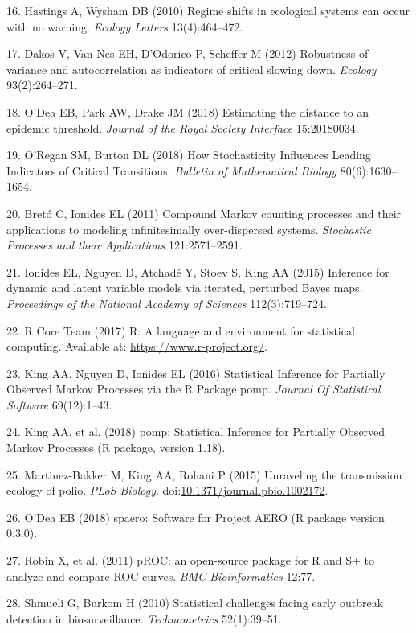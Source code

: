\documentclass[3p]{elsarticle} %
\begin{document}
\hypertarget{ref-Hastings2010}{}
16. Hastings A, Wysham DB (2010) Regime shifts in ecological systems can
occur with no warning. \emph{Ecology Letters} 13(4):464--472.

\hypertarget{ref-Dakos2012a}{}
17. Dakos V, Van Nes EH, D'Odorico P, Scheffer M (2012) Robustness of
variance and autocorrelation as indicators of critical slowing down.
\emph{Ecology} 93(2):264--271.

\hypertarget{ref-ODea2018a}{}
18. O'Dea EB, Park AW, Drake JM (2018) Estimating the distance to an
epidemic threshold. \emph{Journal of the Royal Society Interface}
15:20180034.

\hypertarget{ref-ORegan2018}{}
19. O'Regan SM, Burton DL (2018) How Stochasticity Influences Leading
Indicators of Critical Transitions. \emph{Bulletin of Mathematical
Biology} 80(6):1630--1654.

\hypertarget{ref-Breto2011}{}
20. Bretó C, Ionides EL (2011) Compound Markov counting processes and
their applications to modeling infinitesimally over-dispersed systems.
\emph{Stochastic Processes and their Applications} 121:2571--2591.

\hypertarget{ref-Ionides2015}{}
21. Ionides EL, Nguyen D, Atchadé Y, Stoev S, King AA (2015) Inference
for dynamic and latent variable models via iterated, perturbed Bayes
maps. \emph{Proceedings of the National Academy of Sciences}
112(3):719--724.

\hypertarget{ref-R2017}{}
22. R Core Team (2017) R: A language and environment for statistical
computing. Available at: \url{https://www.r-project.org/}.

\hypertarget{ref-King2016}{}
23. King AA, Nguyen D, Ionides EL (2016) Statistical Inference for
Partially Observed Markov Processes via the R Package pomp.
\emph{Journal Of Statistical Software} 69(12):1--43.

\hypertarget{ref-King2018}{}
24. King AA, et al. (2018) pomp: Statistical Inference for Partially
Observed Markov Processes (R package, version 1.18).

\hypertarget{ref-Martinez-Bakker2015}{}
25. Martinez-Bakker M, King AA, Rohani P (2015) Unraveling the
transmission ecology of polio. \emph{PLoS Biology}.
doi:\href{https://doi.org/10.1371/journal.pbio.1002172}{10.1371/journal.pbio.1002172}.

\hypertarget{ref-ODea2018}{}
26. O'Dea EB (2018) spaero: Software for Project AERO (R package version
0.3.0).

\hypertarget{ref-Robin2011}{}
27. Robin X, et al. (2011) pROC: an open-source package for R and S+ to
analyze and compare ROC curves. \emph{BMC Bioinformatics} 12:77.

\hypertarget{ref-Shmueli2010}{}
28. Shmueli G, Burkom H (2010) Statistical challenges facing early
outbreak detection in biosurveillance. \emph{Technometrics}
52(1):39--51.
\end{document}
